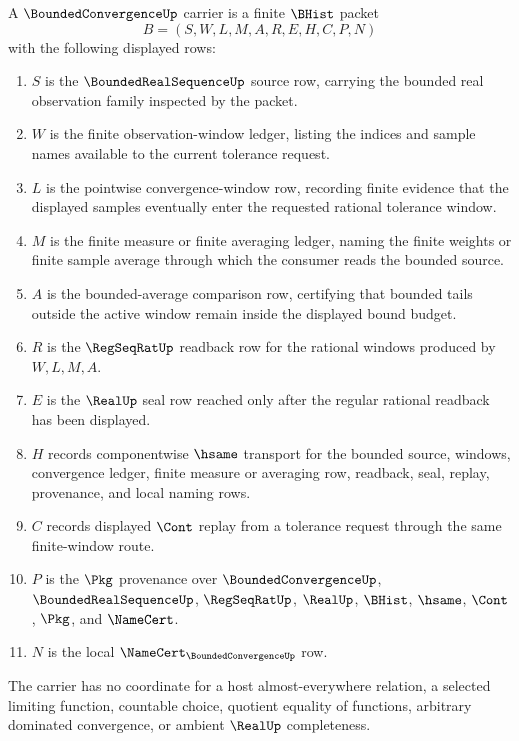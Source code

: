 \begin{definition}
\label{def:bounded-convergence-carrier}
A $\BoundedConvergenceUp$ carrier is a finite $\BHist$ packet
$$
B=(S,W,L,M,A,R,E,H,C,P,N)
$$
with the following displayed rows:
\begin{enumerate}
\item $S$ is the $\BoundedRealSequenceUp$ source row, carrying the bounded real observation family inspected by the packet.
\item $W$ is the finite observation-window ledger, listing the indices and sample names available to the current tolerance request.
\item $L$ is the pointwise convergence-window row, recording finite evidence that the displayed samples eventually enter the requested rational tolerance window.
\item $M$ is the finite measure or finite averaging ledger, naming the finite weights or finite sample average through which the consumer reads the bounded source.
\item $A$ is the bounded-average comparison row, certifying that bounded tails outside the active window remain inside the displayed bound budget.
\item $R$ is the $\RegSeqRatUp$ readback row for the rational windows produced by $W,L,M,A$.
\item $E$ is the $\RealUp$ seal row reached only after the regular rational readback has been displayed.
\item $H$ records componentwise $\hsame$ transport for the bounded source, windows, convergence ledger, finite measure or averaging row, readback, seal, replay, provenance, and local naming rows.
\item $C$ records displayed $\Cont$ replay from a tolerance request through the same finite-window route.
\item $P$ is the $\Pkg$ provenance over $\BoundedConvergenceUp$, $\BoundedRealSequenceUp$, $\RegSeqRatUp$, $\RealUp$, $\BHist$, $\hsame$, $\Cont$, $\Pkg$, and $\NameCert$.
\item $N$ is the local $\NameCert_{\BoundedConvergenceUp}$ row.
\end{enumerate}
The carrier has no coordinate for a host almost-everywhere relation, a selected limiting function, countable choice, quotient equality of functions, arbitrary dominated convergence, or ambient $\RealUp$ completeness.
\end{definition}

